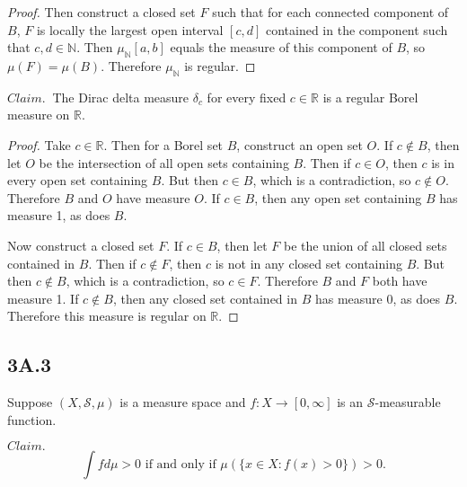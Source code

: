 \documentclass[12pt]{article}
\def\R{\mathbb{R}}
\def\N{\mathbb{N}}
\begin{document}
\begin{itemize}
\begin{proof}
        Then construct a closed set $F$ such that for each connected component of $B$, $F$ is locally the largest open interval $[c, d]$ contained in the component such that $c, d \in \N$. Then $\mu_\N [a, b]$ equals the measure of this component of $B$, so $\mu (F) = \mu (B)$. Therefore $\mu_\N$ is regular.
    \end{proof}

    $Claim.~$ The Dirac delta measure $\delta_c$ for every fixed $c \in \R$ is a regular Borel measure on $\R$.

    \begin{proof}
        Take $c \in \R$. Then for a Borel set $B$, construct an open set $O$. If $c \notin B$, then let $O$ be the intersection of all open sets containing $B$. Then if $c \in O$, then $c$ is in every open set containing $B$. But then $c \in B$, which is a contradiction, so $c \notin O$. Therefore $B$ and $O$ have measure $O$. If $c \in B$, then any open set containing $B$ has measure 1, as does $B$.

        Now construct a closed set $F$. If $c \in B$, then let $F$ be the union of all closed sets contained in $B$. Then if $c \notin F$, then $c$ is not in any closed set containing $B$. But then $c \notin B$, which is a contradiction, so $c \in F$. Therefore $B$ and $F$ both have measure 1. If $c \notin B$, then any closed set contained in $B$ has measure 0, as does $B$. Therefore this measure is regular on $\R$.
    \end{proof}
\end{itemize}

\subsection*{3A.3}

Suppose $(X, \mathcal{S}, \mu)$ is a measure space and $f : X \to [0, \infty]$ is an $\mathcal{S}$-measurable function.

$Claim.~$ $$\int f d \mu > 0 \text{ if and only if } \mu( \{ x \in X: f(x) > 0\}) > 0.$$
\end{document}
